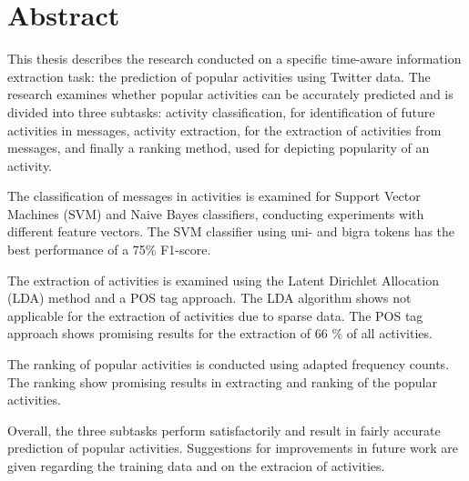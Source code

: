 

\begingroup
\let\clearpage\relax
\let\cleardoublepage\relax
\let\cleardoublepage\relax

\chapter*{Abstract} %

This thesis describes the research conducted on a specific time-aware information extraction task: the prediction of popular activities using Twitter data. The research examines whether popular activities can be accurately predicted and is divided into three subtasks: activity classification, for identification of future activities in messages, activity extraction, for the extraction of activities from messages, and finally a ranking method, used for depicting popularity of an activity. 

The classification of messages in activities is examined for Support Vector Machines (SVM) and Naive Bayes classifiers, conducting experiments with different feature vectors. The SVM classifier using uni- and bigra tokens has the best performance of a 75\% F1-score. 

The extraction of activities is examined using the Latent Dirichlet Allocation (LDA) method and a POS tag approach. The LDA algorithm shows not applicable for the extraction of activities due to sparse data. The POS tag approach shows promising results for the extraction of 66 \% of all activities. 

The ranking of popular activities is conducted using adapted frequency counts. The ranking show promising results in extracting and ranking of the popular activities.

Overall, the three subtasks perform satisfactorily and result in fairly accurate prediction of popular activities. Suggestions for improvements in future work are given regarding the training data and on the extracion of activities.

\endgroup			

\vfill